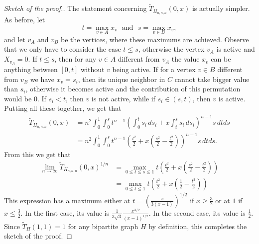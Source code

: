\documentclass[10pt,a4paper]{amsart}
\newcommand{\wT}{\widetilde{T}}
\begin{document}
\begin{proof}[Sketch of the proof.]
The statement concerning $\wT_{H_{n,n,n}}(0,x)$ is actually simpler. 
As before, let
$$t=\max_{v\in A}x_v\ \ \ \text{and}\ \ \ s=\max_{v\in B}x_v,$$
and let $v_A$ and $v_B$ be the vertices, where these maximums are achieved. Observe that we only have to consider the case $t\leqslant s$, otherwise the vertex $v_A$ is active and $X_{v_A}=0$. If $t\leqslant s$, then for any $v\in A$ different from $v_A$ the value $x_v$ can be anything between $[0,t]$ without $v$ being active. If for a vertex $v\in B$ different from $v_B$ we have $x_v=s_i$, then its unique neighbor in $C$ cannot take bigger value than $s_i$, otherwise it becomes active and the contribution of this permutation would be $0$. If $s_i<t$, then $v$ is not active, while if $s_i\in (s,t)$, then $v$ is active.  Putting all these together, we get that
\begin{align*}
\wT_{H_{n,n,n}}(0,x)&=n^2\int_0^1\int_0^st^{n-1}\left(\int_0^ts_i\, ds_i+x\int_t^ss_i\, ds_i\right)^{n-1}s\, dtds\\
&=n^2\int_0^1\int_0^st^{n-1}\left(\frac{t^2}{2}+x\left(\frac{s^2}{2}-\frac{t^2}{2}\right)\right)^{n-1}s\, dt ds.
\end{align*}
From this we get that
\begin{align*}
\lim_{n\to \infty}\wT_{H_{n,n,n}}(0,x)^{1/n}&=\max_{0\leqslant   t\leqslant   s\leqslant   1}t\left(\frac{t^2}{2}+x\left(\frac{s^2}{2}-\frac{t^2}{2}\right)\right)\\
&=\max_{0\leqslant   t\leqslant   1}t\left(\frac{t^2}{2}+x\left(\frac{1}{2}-\frac{t^2}{2}\right)\right)
\end{align*}
This expression has a maximum either at $t=\left(\frac{x}{3(x-1)}\right)^{1/2}$ if $x\geqslant\frac{3}{2}$ or at $1$ if $x\leqslant   \frac{3}{2}$. In the first case, its value is $\frac{1}{3\sqrt{3}}\frac{x^{3/2}}{(x-1)^{1/2}}$. In the second case, its value is $\frac{1}{2}$. Since $\wT_H(1,1)=1$ for any bipartite graph $H$ by definition, this completes the sketch of the proof.
\end{proof}
\end{document}
